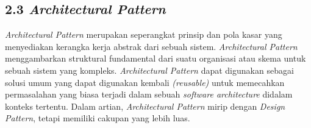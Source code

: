 \documentclass[a4paper]{article}
\begin{document}
\subsection*{2.3 \textit{Architectural Pattern}}
\textit{Architectural Pattern} merupakan seperangkat prinsip dan pola kasar yang menyediakan kerangka kerja abstrak dari sebuah sistem. \textit{Architectural Pattern} menggambarkan struktural fundamental dari suatu organisasi atau skema untuk sebuah sistem yang kompleks. \textit{Architectural Pattern} dapat digunakan sebagai solusi umum yang dapat digunakan kembali \textit{(reusable)} untuk memecahkan permasalahan yang biasa terjadi dalam sebuah \textit{software architecture} didalam konteks tertentu\autocite*{architectural-pattern}. Dalam artian, \textit{Architectural Pattern} mirip dengan \textit{Design Pattern}, tetapi memiliki cakupan yang lebih luas\autocite*{archi-pattern}.
\end{document}
